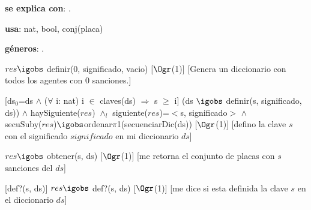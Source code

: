 \begin{Interfaz}

	\textbf{se explica con}: .

	\textbf{usa}: nat, bool, conj(placa)

	\textbf{géneros}: .


	{$res \igobs$ definir($0$, significado, vacio)}
	[$\Ogr$(1)]
	[Genera un diccionario con todos los agentes con $0$ sanciones.]

	[ds$_0$=ds $\land$ ($\forall$ i: nat) i $\in$ claves(ds) $\Rightarrow$ s $\geq$ i]
	{(ds $\igobs$ definir(s, significado, ds)) $\land$ haySiguiente($res$) $\land_l$ siguiente($res$)=$<$s, significado$>$ $\land$\\
	secuSuby($res$)$\igobs$ordenar$\pi$1(secuenciarDic(ds))}%
	[$\Ogr$(1)]
	[defino la clave $s$ con el significado $significado$ en mi diccionario $ds$]
	
	{$res \igobs$ obtener(s, ds)}
	[$\Ogr$(1)]
	[me retorna el conjunto de placas con $s$ sanciones del $ds$]

	[def?(s, ds)]
	{$res \igobs$ def?(s, ds)}  
	[$\Ogr$(1)]
	[me dice si esta definida la clave $s$ en el diccionario $ds$]
	
\end{Interfaz}

